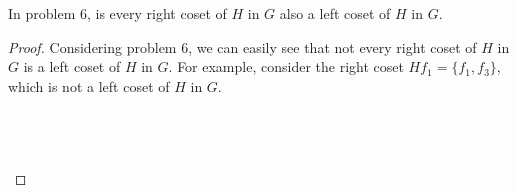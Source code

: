 \documentclass[12pt]{article}
\newenvironment{problem}[2][Problem]{\begin{trivlist}
\item[\hskip \labelsep {\bfseries #1}\hskip \labelsep {\bfseries #2.}]}{\end{trivlist}}
\begin{document}
\begin{problem}{2.4.7}
In problem 6, is every right coset of $H$ in $G$ also a left coset of $H$ in $G$.
\end{problem}

\begin{proof}
Considering problem 6, we can easily see that not every right coset of $H$ in $G$ is a left coset of $H$ in $G$. For example, consider the right coset $Hf_1 = \{f_1,f_3\}$, which is not a left coset of $H$ in $G$. \\ \\
\centerline{} \\ \\
\end{proof}



 
\end{document}
